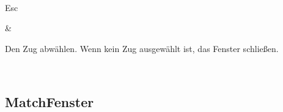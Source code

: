 \documentclass[letterpaper,10pt,german]{sphinxmanual}
\begin{document}
\begin{savenotes}
\begin{tabular}[t]{}
\begin{varwidth}[t]{}
\end{varwidth}%
\\
\sphinxhline\begin{varwidth}[t]{}
\sphinxAtStartPar
Esc
\sphinxbeforeendvarwidth
\end{varwidth}%
&\begin{varwidth}[t]{}
\sphinxAtStartPar
Den Zug abwählen. Wenn kein Zug ausgewählt ist, das Fenster schließen.
\sphinxbeforeendvarwidth
\end{varwidth}%
\\
\sphinxbottomrule
\end{tabular}
\sphinxtableafterendhook\par
\sphinxattableend\end{savenotes}


\subsection{Match\sphinxhyphen{}Fenster}
\label{\detokenize{raccourcis:panneau-des-matchs}}\label{\detokenize{raccourcis:raccourcis-match-panel}}
\end{document}
